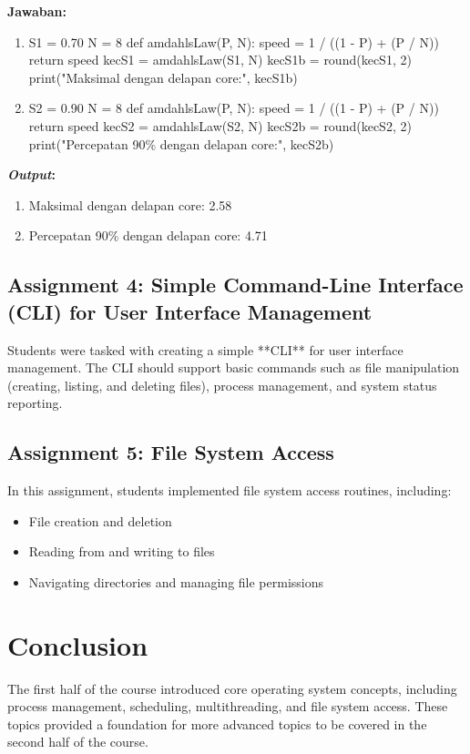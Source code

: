 \documentclass[12pt]{article}
\begin{document}
\par \textbf{Jawaban:}
\begin{enumerate}
    \item 
    
    \begin{python}
        S1 = 0.70 
        N = 8
        def amdahlsLaw(P, N):
            speed = 1 / ((1 - P) + (P / N))
            return speed
        kecS1 = amdahlsLaw(S1, N)
        kecS1b = round(kecS1, 2)
        print("Maksimal dengan delapan core:", kecS1b)
    \end{python}
    
    \item 
    
    \begin{python}
        S2 = 0.90
        N = 8
        def amdahlsLaw(P, N):
            speed = 1 / ((1 - P) + (P / N))
            return speed
        kecS2 = amdahlsLaw(S2, N)
        kecS2b = round(kecS2, 2)
        print("Percepatan 90\% dengan delapan core:", kecS2b)
    \end{python}
\end{enumerate}
\par \textbf{\textit{Output}:}
\begin{enumerate}
    \item Maksimal dengan delapan core: 2.58
    \item Percepatan 90\% dengan delapan core: 4.71
\end{enumerate}

\subsection{Assignment 4: Simple Command-Line Interface (CLI) for User Interface Management}
Students were tasked with creating a simple **CLI** for user interface management. The CLI should support basic commands such as file manipulation (creating, listing, and deleting files), process management, and system status reporting.

\subsection{Assignment 5: File System Access}
In this assignment, students implemented file system access routines, including:
\begin{itemize}
    \item File creation and deletion
    \item Reading from and writing to files
    \item Navigating directories and managing file permissions
\end{itemize}

\section{Conclusion}
The first half of the course introduced core operating system concepts, including process management, scheduling, multithreading, and file system access. These topics provided a foundation for more advanced topics to be covered in the second half of the course.
\end{document}
